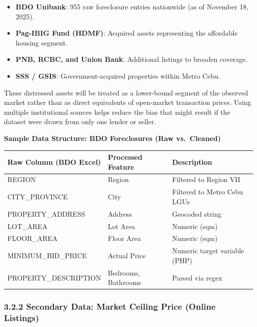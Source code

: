 \begin{itemize}
\item \textbf{BDO Unibank}: 955 raw foreclosure entries nationwide (as of November 18, 2025).
\item \textbf{Pag-IBIG Fund (HDMF)}: Acquired assets representing the affordable housing segment.
\item \textbf{PNB, RCBC, and Union Bank}: Additional listings to broaden coverage.
\item \textbf{SSS / GSIS}: Government-acquired properties within Metro Cebu.
\end{itemize}

These distressed assets will be treated as a lower-bound segment of the observed market rather than as direct equivalents of open-market transaction prices. Using multiple institutional sources helps reduce the bias that might result if the dataset were drawn from only one lender or seller.

\textbf{Sample Data Structure: BDO Foreclosures (Raw vs.~Cleaned)}

\begin{center}
\begin{tabular}{p{} p{} p{}}
\toprule
Raw Column (BDO Excel) & Processed Feature & Description \\
\midrule
REGION & Region & Filtered to Region VII \\
CITY\_PROVINCE & City & Filtered to Metro Cebu LGUs \\
PROPERTY\_ADDRESS & Address & Geocoded string \\
LOT\_AREA & Lot Area & Numeric (sqm) \\
FLOOR\_AREA & Floor Area & Numeric (sqm) \\
MINIMUM\_BID\_PRICE & Actual Price & Numeric target variable (PHP) \\
PROPERTY\_DESCRIPTION & Bedrooms, Bathrooms & Parsed via regex \\
\bottomrule
\end{tabular}
\end{center}

\subsubsection{\texorpdfstring{\textbf{3.2.2 Secondary Data: Market Ceiling Price (Online Listings)}}{3.2.2 Secondary Data: Market Ceiling Price (Online Listings)}}\label{secondary-data-market-ceiling-price-online-listings}

